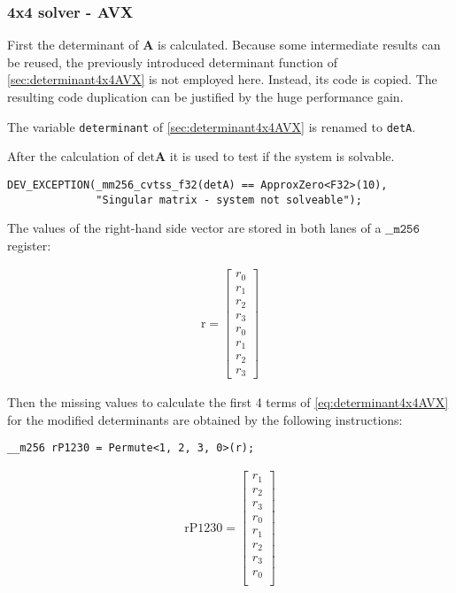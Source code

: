 \newpage
\subsubsection{4x4 solver - AVX}

First the determinant of $\mathbf{A}$ is calculated.
Because some intermediate results can be reused, the previously introduced determinant function of \cref{sec:determinant4x4AVX} is not employed here. 
Instead, its code is copied. 
The resulting code duplication can be justified by the huge performance gain.

The variable \texttt{determinant} of \cref{sec:determinant4x4AVX} is renamed to \texttt{detA}.

After the calculation of $\mathrm{det}\mathbf{A}$ it is used to test if the system is solvable.

\begin{verbatim}
DEV_EXCEPTION(_mm256_cvtss_f32(detA) == ApproxZero<F32>(10), 
              "Singular matrix - system not solveable");
\end{verbatim} 

The values of the right-hand side vector are stored in both lanes of a $\texttt{__m256}$ register:


\begin{align*}
\mathrm{r} 
=
\begin{bmatrix}
r_0\\
r_1\\
r_2\\
r_3\\
r_0\\
r_1\\
r_2\\
r_3
\end{bmatrix}
\end{align*}


Then the missing values to calculate the first 4 terms of \cref{eq:determinant4x4AVX} for the modified determinants are obtained by the following instructions:

\begin{verbatim}
__m256 rP1230 = Permute<1, 2, 3, 0>(r);
\end{verbatim} 

\begin{align*}
\mathrm{rP1230} 
=
\begin{bmatrix}
r_1\\
r_2\\
r_3\\
r_0\\
r_1\\
r_2\\
r_3\\
r_0\\
\end{bmatrix}
\end{align*}

